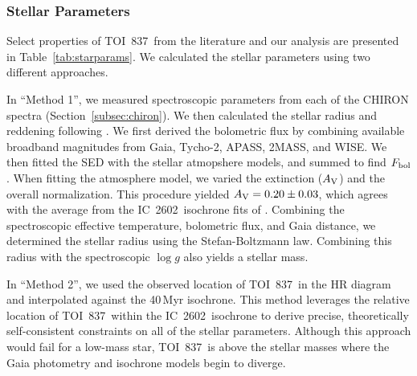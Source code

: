 \documentclass[12pt,twocolumn,tighten]{aastex63}
\newcommand{\tn}{TOI~837} %
\newcommand{\cn}{IC~2602} %
\begin{document}
\subsubsection{Stellar Parameters}
\label{subsec:starparams}

Select properties of \tn\ from the literature and our analysis are
presented in Table~\ref{tab:starparams}.  We calculated the stellar
parameters using two different approaches.


In ``Method 1'', we measured spectroscopic parameters from each of the
CHIRON spectra (Section~\ref{subsec:chiron}).  We then calculated the
stellar radius and reddening following \citet{stassun_accurate_2017}.
We first derived the bolometric flux by combining available broadband
magnitudes from Gaia, Tycho-2, APASS, 2MASS, and WISE.  We then fitted
the SED with the \citet{kurucz_atlas12_2013} stellar atmopshere
models, and summed to find $F_{\rm bol}$.  When fitting the atmosphere
model, we varied the extinction ($A_{\rm V}$) and the overall
normalization.  This procedure yielded $A_{\rm V} = 0.20\pm0.03$,
which agrees with the average from the \cn\ isochrone fits of
\citet{randich_gaiaeso_2018}.  Combining the spectroscopic effective
temperature, bolometric flux, and Gaia distance, we determined the
stellar radius using the Stefan-Boltzmann law.  Combining this radius
with the spectroscopic $\log g$ also yields a stellar mass.

In ``Method 2'', we  used the observed location of
\tn\ in the HR diagram and interpolated against the 40$\,$Myr
 isochrone.  This method leverages the relative location
of \tn\ within the  \cn\ isochrone to derive precise,
theoretically self-consistent constraints on all of the stellar
parameters.  Although this approach would fail for a low-mass star,
\tn\ is above the stellar masses where the Gaia photometry and
isochrone models begin to diverge.
\end{document}
